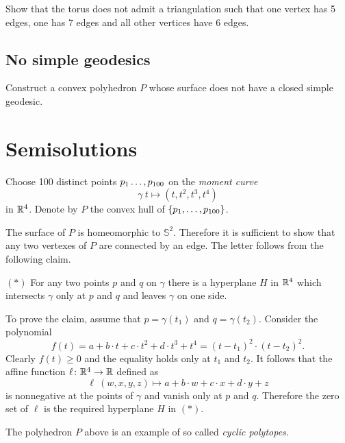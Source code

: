 \begin{pr}
Show that the torus does not admit a triangulation 
such that one vertex has 5 edges,
one has 7 edges and 
all other vertices have 
6 edges. 
\end{pr}


\subsection*{No simple geodesics\easy}\label{No simple geodesics}

\begin{pr}
Construct a convex polyhedron $P$ whose surface 
does not have a closed simple geodesic.
\end{pr}

\section*{Semisolutions}


Choose 100 distinct points $p_1\z\dots,p_{100}$
on the {}\emph{moment curve} 
\[\gamma\:t\mapsto (t,t^2,t^3,t^4)\] 
in $\mathbb{R}^4$.
Denote by $P$ the convex hull of $\{p_1,\z\dots,p_{100}\}$.

The surface of $P$ is homeomorphic to $\mathbb{S}^2$.
Therefore it is sufficient to show that any two vertexes of $P$ are connected by an edge.
The letter follows from the following claim.

\begin{cl}{$({*})$}
For any two points $p$ and $q$ on $\gamma$ there is a hyperplane $H$ in $\mathbb{R}^4$ which intersects $\gamma$ only at $p$ and $q$ and leaves $\gamma$ on one side.
\end{cl}

To prove the claim, assume that $p=\gamma(t_1)$ and $q=\gamma(t_2)$. 
Consider the polynomial
\[f(t)=a+b\cdot t+c\cdot t^2+d\cdot t^3+t^4=(t-t_1)^2\cdot(t-t_2)^2.\]
Clearly $f(t)\ge 0$ and the equality holds only at $t_1$ and $t_2$.
It follows that the affine function $\ell\colon\mathbb{R}^4\to\mathbb{R}$ defined as 
\[\ell\:(w,x,y,z)\mapsto a+b\cdot w+c\cdot x+d\cdot y+z\]
is nonnegative at the points of $\gamma$ and vanish only at $p$ and $q$.
Therefore the zero set of $\ell$ is the required hyperplane $H$ in $({*})$. 
\qeds

The polyhedron $P$ above is an example 
of so called \emph{cyclic polytopes}.

